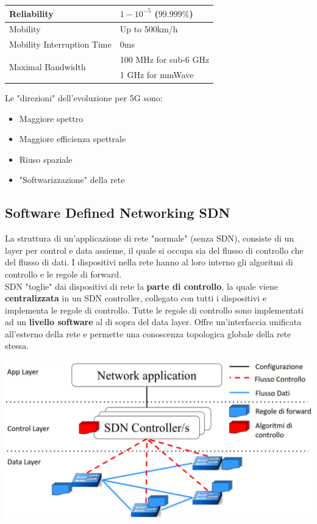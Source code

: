 \begin{center}
{\begin{tabular}{l | l}
			Reliability & $1-10^{-5}$ ($99.999\%$) \\
			\hline
			
			Mobility & Up to 500km/h \\
			\hline
			
			Mobility Interruption Time & 0ms \\
			\hline
			
			\multirow{2}{*}{Maximal Bandwidth} & 100 MHz for sub-6 GHz \\
			\cline{2-2}
			& 1 GHz for mmWave \\
			\hline
	\end{tabular}}
\end{center}

Le "direzioni" dell'evoluzione per 5G sono: 
\begin{itemize}
	\item Maggiore spettro
	\item Maggiore efficienza spettrale
	\item Riuso spaziale
	\item "Softwarizzazione" della rete
\end{itemize}


\newpage

\subsection{Software Defined Networking SDN}

La struttura di un'applicazione di rete "normale" (senza SDN), consiste di un layer per control e data assieme, il quale si occupa sia del flusso di controllo che del flusso di dati. I dispositivi nella rete hanno al loro interno gli algoritmi di controllo e le regole di forward. \\

SDN "toglie" dai dispositivi di rete la \textbf{parte di controllo}, la quale viene \textbf{centralizzata} in un SDN controller, collegato con tutti i dispositivi e implementa le regole di controllo. Tutte le regole di controllo sono implementati ad un \textbf{livello software} al di sopra del data layer. Offre un'interfaccia unificata all'esterno della rete e permette una conoscenza topologica globale della rete stessa.\\

\begin{center}
	\includegraphics[width=0.8\linewidth]{img/5g/sdn1}
\end{center}

